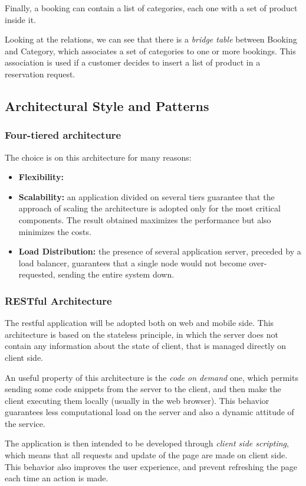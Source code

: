 \documentclass[table, 12pt]{article}
\begin{document}
Finally, a booking can contain a list of categories, each one with a set of product inside it.

Looking at the relations, we can see that there is a \textit{bridge table} between Booking and Category, which associates a set of categories to one or more bookings. This association is used if a customer decides to insert a list of product in a reservation request.

\subsection{Architectural Style and Patterns}
\subsubsection{Four-tiered architecture}
The choice is on this architecture for many reasons:
\begin{itemize}
    \item \textbf{Flexibility:} 
    \item \textbf{Scalability:} an application divided on several tiers guarantee that the approach of scaling the architecture is adopted only for the most critical components. The result obtained maximizes the performance but also minimizes the costs.
    \item \textbf{Load Distribution:} the presence of several application server, preceded by a load balancer, guarantees that a single node would not become over-requested, sending the entire system down.
\end{itemize}

\subsubsection{RESTful Architecture}
The restful application will be adopted both on web and mobile side. This architecture is based on the stateless principle, in which the server does not contain any information about the state of client, that is managed directly on client side.

An useful property of this architecture is the \textit{code on demand} one, which permits sending some code snippets from the server to the client, and then make the client executing them locally (usually in the web browser). This behavior guarantees less computational load on the server and also a dynamic attitude of the service.

The application is then intended to be developed through \textit{client side scripting}, which means that all requests and update of the page are made on client side. This behavior also improves the user experience, and prevent refreshing the page each time an action is made.
\end{document}
